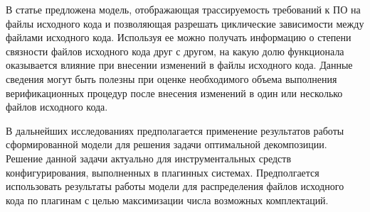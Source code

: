 

В статье предложена модель, отображающая трассируемость требований к ПО на файлы исходного кода и позволяющая разрешать циклические зависимости между файлами исходного кода. Используя ее можно получать информацию о степени связности файлов исходного кода друг с другом, на какую долю функционала оказывается влияние при внесении изменений в файлы исходного кода. Данные сведения могут быть полезны при оценке необходимого объема выполнения верификационных процедур после внесения изменений в один или несколько файлов исходного кода.

В дальнейших исследованиях предполагается применение результатов работы сформированной модели для решения задачи оптимальной декомпозиции. Решение данной задачи актуально для инструментальных средств конфигурирования, выполненных в плагинных системах. Предполгается использовать результаты работы модели для распределения файлов исходного кода по плагинам с целью максимизации числа возможных комплектаций.